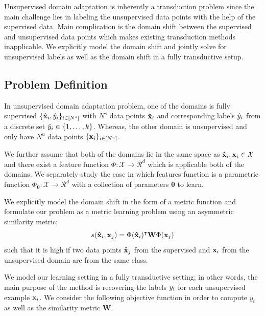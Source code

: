 Unsupervised domain adaptation is inherently a transduction problem since the main challenge lies in labeling the unsupervised data points with the help of the supervised data. Main complication is the domain shift between the supervised and unsupervised data points which makes existing transduction methods inapplicable. We explicitly model the domain shift and jointly solve for unsupervised labels as well as the domain shift in a fully transductive setup.

\subsection{Problem Definition}
In unsupervised domain adaptation problem, one of the domains is fully supervised $\{\mathbf{\hat{x}}_i, \hat{y}_i \}_{i \in [N^s]}$ with $N^s$ data points $\mathbf{\hat{x}}_i$ and corresponding labels $\hat{y}_i$ from a discrete set $\hat{y}_i \in \{1,\ldots, k \}$. Whereas, the other domain is unsupervised and only have $N^u$ data points $\{\mathbf{x}_i \}_{i \in [N^u]}$. 


We further assume that both of the domains lie in the same space as $\mathbf{\hat{x}}_i,\mathbf{x}_i \in \mathcal{X}$ and there exist a feature function \mbox{$\Phi:\mathcal{X}\rightarrow \mathcal{R}^d$} which is applicable both of the domains. We separately study the case in which features function is a parametric function \mbox{$\Phi_\mathbf{\theta}:\mathcal{X}\rightarrow \mathcal{R}^d$} with a collection of parameters $\mathbf{\theta}$ to learn.

We explicitly model the domain shift in the form of a metric function and formulate our problem as a metric learning problem using an asymmetric similarity metric;
\begin{equation}
s(\mathbf{\hat{x}}_i,\mathbf{x}_j) = \Phi(\mathbf{\hat{x}}_i)^\intercal \mathbf{W} \Phi(\mathbf{x}_j)
\end{equation}
such that it is high if two data points $\mathbf{\hat{x}}_j$ from the supervised and $\mathbf{x}_i$ from the unsupervised domain are from the same class.

We model our learning setting in a fully transductive setting; in other words, the main purpose of the method is recovering the labels $y_i$ for each unsupervised example $\mathbf{x}_i$. We consider the following objective function in order to compute $y_i$ as well as the similarity metric $\mathbf{W}$.

